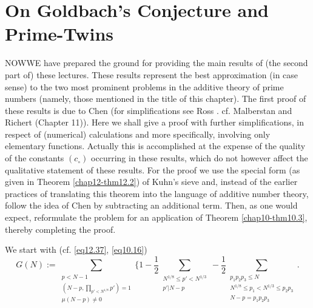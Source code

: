 
\chapter{On Goldbach's Conjecture and Prime-Twins}\label{chap13}%

NOW\pageoriginale WE have prepared the ground for providing the main
results of (the second part of) these lectures. These results
represent the best approximation (in case sense) to the two most
prominent problems in the additive theory of prime numbers (namely,
those mentioned in the title of this chapter). The first proof of
these results is due to Chen \cite{key1} (for simplifications see Ross
\cite{key1}. cf. Malberstan and Richert \cite{key1} (Chapter
11)). Here we shall give a 
proof with further simplifications, in respect of (numerical)
calculations and more specifically, involving only elementary
functions. Actually this is accomplished at the expense of the quality
of the constants $(c_\circ)$ occurring in these results, which do not
however affect the qualitative statement of these results. For the
proof we use the special form (as given in Theorem
\ref{chap12-thm12.2}) of Kuhn's 
sieve and, instead of the earlier practices of translating this
theorem into the language of additive number theory, follow the idea
of Chen by subtracting an additional term. Then, as one would expect,
reformulate the problem for an application of Theorem
\ref{chap10-thm10.3}, thereby completing the proof. 
 
We start with (cf. \eqref{eq12.37}, \eqref{eq10.16})
\begin{equation*}
G(N):=\sum_{\substack{p <N-1 \\ (N-p,
    \prod\limits_{p'<N^{1/8}} p') =1\\ \mu (N-p) \neq 0}} \big
\{1-\frac{1}{2}\sum_{\substack{N^{1/8}\leq p' < N^{1/3}\\p' |N-p}}
-\frac{1}{2} \sum_{\substack{p_1p_2p_3 \leq N \\N^{1/8} \leq p_1
    <N^{1/3} \leq p_2 p_3 \\ N-p=p_1p_2p_3}}. \tag{13.1}\label{eq13.1} 
 \end{equation*} 
 
